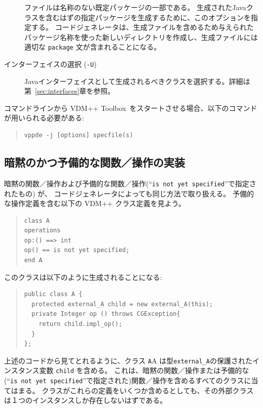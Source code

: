 \documentclass[\pformat,11pt]{jarticle}
\newcommand{\ToolboxName}{VDM++ Toolbox}
\newcommand{\tcg}{コードジェネレータ}
\begin{document}
\begin{description}
ファイルは名称のない既定パッケージの一部である。
生成されたJavaクラスを含むはずの指定パッケージを生成するために、このオプションを指定する。
コードジェネレータは、生成ファイルを含めるため与えられたパッケージ名称を使った新しいディレクトリを作成し、生成ファイルには適切な  \texttt{package} 文が含まれることになる。%
\item [インターフェイスの選択 (\texttt{-U})]
  Javaインターフェイスとして生成されるべきクラスを選択する。詳細は第~\ref{sec:interfaces}章を参照。
\end{description}

コマンドラインから \ToolboxName\ をスタートさせる場合、以下のコマンドが用いられる必要がある:

\begin{quote}
\begin{verbatim}
vppde -j [options] specfile(s)
\end{verbatim}
\end{quote}


\subsection{暗黙のかつ予備的な関数／操作の実装}\label{implicit}

暗黙の関数／操作および予備的な関数／操作(``{\tt is not yet specified}''で指定されたもの) が、 \tcg{}によっても同じ方法で取り扱える。
予備的な操作定義を含む以下の VDM++ クラス定義を見よう。

\begin{quote}
\begin{verbatim}
class A
operations
op:() ==> int
op() == is not yet specified;
end A
\end{verbatim}
\end{quote}

このクラスは以下のように生成されることになる:

\begin{quote}
\begin{verbatim}
public class A {
  protected external_A child = new external_A(this);
  private Integer op () throws CGException{
    return child.impl_op();
  }
};
\end{verbatim}
\end{quote}

上述のコードから見てとれるように、クラス \texttt{A}A は型{\tt external\_A}の保護されたインスタンス変数 {\tt child} を含める。
これは、暗黙の関数／操作または予備的な (``{\tt is not yet   specified}''で指定された)関数／操作を含めるすべてのクラスに当てはまる。
クラスがこれらの定義をいくつか含めるとしても、その外部クラスは１つのインスタンスしか存在しないはずである。
\end{document}
